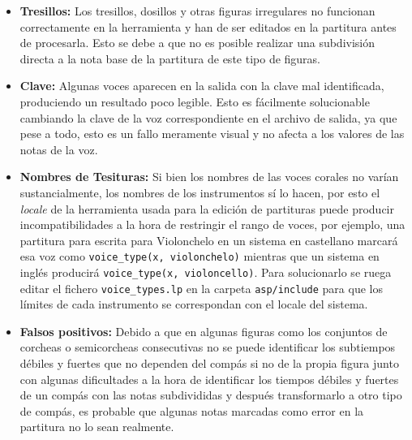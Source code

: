   \begin{itemize}
  		\item \textbf{Tresillos:} Los tresillos, dosillos y otras figuras irregulares no funcionan correctamente en la herramienta y han de ser editados en la partitura antes de procesarla. Esto se debe a que no es posible realizar una subdivisión directa a la nota base de la partitura de este tipo de figuras.
  		\item \textbf{Clave:} Algunas voces aparecen en la salida con la clave mal identificada, produciendo un resultado poco legible. Esto es fácilmente solucionable cambiando la clave de la voz correspondiente en el archivo de salida, ya que pese a todo, esto es un fallo meramente visual y no afecta a los valores de las notas de la voz.
  		\item \textbf{Nombres de Tesituras:} Si bien los nombres de las voces corales no varían sustancialmente, los nombres de los instrumentos sí lo hacen, por esto el \textit{locale} de la herramienta usada para la edición de partituras puede producir incompatibilidades a la hora de restringir el rango de voces, por ejemplo, una partitura para escrita para Violonchelo en un sistema en castellano marcará esa voz como \texttt{voice\_type(x, violonchelo)} mientras que un sistema en inglés producirá  \texttt{voice\_type(x, violoncello)}. Para solucionarlo se ruega editar el fichero \texttt{voice\_types.lp} en la carpeta \texttt{asp/include} para que los límites de cada instrumento se correspondan con el locale del sistema.
  		\item \textbf{Falsos positivos:} Debido a que en algunas figuras como los conjuntos de corcheas o semicorcheas consecutivas no se puede identificar los subtiempos débiles y fuertes que no dependen del compás si no de la propia figura junto con algunas dificultades a la hora de identificar los tiempos débiles y fuertes de un compás con las notas subdivididas y después transformarlo a otro tipo de compás, es probable que algunas notas marcadas como error en la partitura no lo sean realmente.
  \end{itemize}
  

